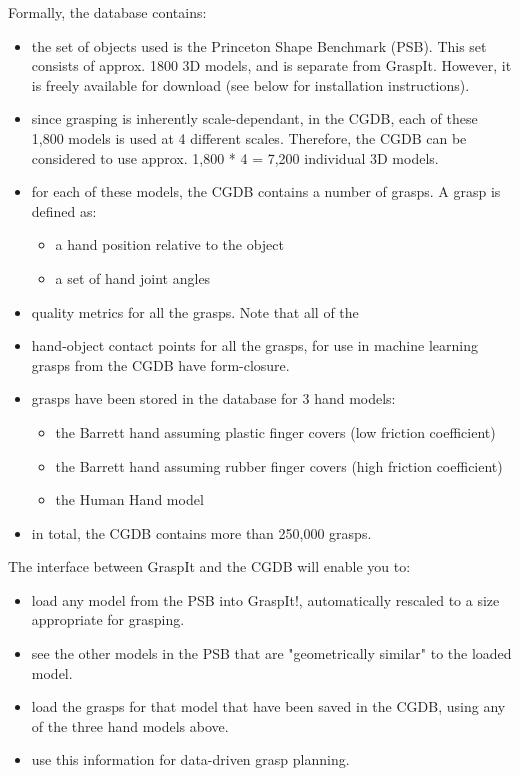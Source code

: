 Formally, the database contains:
\begin{itemize}
	\item the set of objects used is the Princeton Shape Benchmark
      (PSB). This set consists of approx. 1800 3D models, and is
      separate from GraspIt. However, it is freely available for
      download (see below for installation instructions).
	\item since grasping is inherently scale-dependant, in the CGDB,
      each of these 1,800 models is used at 4 different
      scales. Therefore, the CGDB can be considered to use
      approx. 1,800 * 4 = 7,200 individual 3D models.
	\item for each of these models, the CGDB contains a number of
      grasps. A grasp is defined as:
	\begin{itemize}
		\item a hand position relative to the object
		\item a set of hand joint angles
	\end{itemize}
	\item quality metrics for all the grasps. Note that all of the
	\item hand-object contact points for all the grasps, for use in
      machine learning grasps from the CGDB have form-closure.
	\item grasps have been stored in the database for 3 hand models:
	\begin{itemize}
		\item the Barrett hand assuming plastic finger covers (low
          friction coefficient)
		\item the Barrett hand assuming rubber finger covers (high
          friction coefficient)
		\item the Human Hand model
	\end{itemize}
	\item in total, the CGDB contains more than 250,000 grasps.
\end{itemize}

The interface between GraspIt and the CGDB will enable you to:

\begin{itemize}
	\item load any model from the PSB into GraspIt!, automatically
      rescaled to a size appropriate for grasping.
	\item see the other models in the PSB that are "geometrically
      similar" to the loaded model.
	\item load the grasps for that model that have been saved in the
      CGDB, using any of the three hand models above.
	\item use this information for data-driven grasp planning.
\end{itemize}

